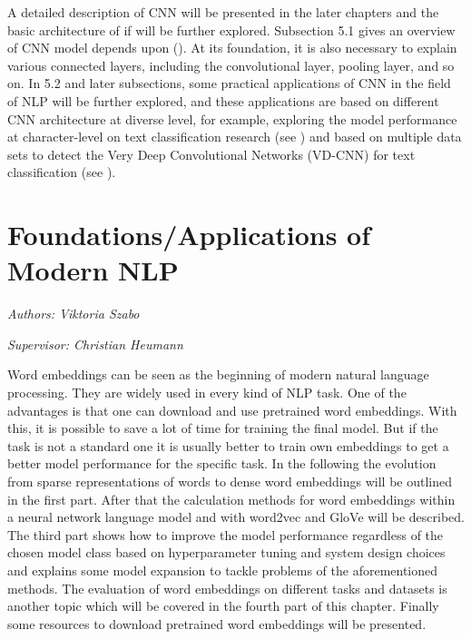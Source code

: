 \documentclass[]{krantz}
\begin{document}
\newpage

A detailed description of CNN will be presented in the later chapters and the basic architecture of if will be further explored. Subsection 5.1 gives an overview of CNN model depends upon (\citet{Kim2014ConvolutionalNN}). At its foundation, it is also necessary to explain various connected layers, including the convolutional layer, pooling layer, and so on. In 5.2 and later subsections, some practical applications of CNN in the field of NLP will be further explored, and these applications are based on different CNN architecture at diverse level, for example, exploring the model performance at character-level on text classification research (see \citet{Zhang2015CharacterlevelCN}) and based on multiple data sets to detect the Very Deep Convolutional Networks (VD-CNN) for text classification (see \citet{Schwenk2017VeryDC}).

\hypertarget{foundationsapplications-of-modern-nlp}{%
\chapter{Foundations/Applications of Modern NLP}\label{foundationsapplications-of-modern-nlp}}

\emph{Authors: Viktoria Szabo}

\emph{Supervisor: Christian Heumann}

Word embeddings can be seen as the beginning of modern natural language processing. They are widely used in every kind of NLP task. One of the advantages is that one can download and use pretrained word embeddings. With this, it is possible to save a lot of time for training the final model. But if the task is not a standard one it is usually better to train own embeddings to get a better model performance for the specific task. In the following the evolution from sparse representations of words to dense word embeddings will be outlined in the first part. After that the calculation methods for word embeddings within a neural network language model and with word2vec and GloVe will be described. The third part shows how to improve the model performance regardless of the chosen model class based on hyperparameter tuning and system design choices and explains some model expansion to tackle problems of the aforementioned methods. The evaluation of word embeddings on different tasks and datasets is another topic which will be covered in the fourth part of this chapter. Finally some resources to download pretrained word embeddings will be presented.
\end{document}

